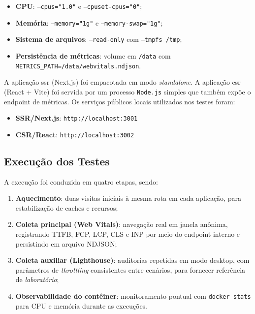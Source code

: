 \begin{itemize}
    \item \textbf{CPU}: \texttt{--cpus="1.0"} e \texttt{--cpuset-cpus="0"};
    \item \textbf{Memória}: \texttt{--memory="1g"} e \texttt{--memory-swap="1g"};
    \item \textbf{Sistema de arquivos}: \texttt{--read-only} com \texttt{--tmpfs /tmp};
    \item \textbf{Persistência de métricas}: volume em \texttt{/data} com \texttt{METRICS\_PATH=/data/webvitals.ndjson}.
\end{itemize}

A aplicação \acrshort{ssr} (Next.js) foi empacotada em modo \textit{standalone}. A aplicação \acrshort{csr} (React + Vite) foi servida por um processo \texttt{Node.js} simples que também expõe o endpoint de métricas. Os serviços públicos locais utilizados nos testes foram:
\begin{itemize}
    \item \textbf{SSR/Next.js}: \texttt{http://localhost:3001}
    \item \textbf{CSR/React}: \texttt{http://localhost:3002}
\end{itemize}

\subsection{Execução dos Testes}

A execução foi conduzida em quatro etapas, sendo:

\begin{enumerate}
    \item \textbf{Aquecimento}: duas visitas iniciais à mesma rota em cada aplicação, para estabilização de caches e recursos;
    \item \textbf{Coleta principal (Web Vitals)}: navegação real em janela anônima, registrando TTFB, FCP, LCP, CLS e INP por meio do endpoint interno e persistindo em arquivo NDJSON;
    \item \textbf{Coleta auxiliar (Lighthouse)}: auditorias repetidas em modo desktop, com parâmetros de \textit{throttling} consistentes entre cenários, para fornecer referência de \textit{laboratório};
    \item \textbf{Observabilidade do contêiner}: monitoramento pontual com \texttt{docker stats} para CPU e memória durante as execuções.
\end{enumerate}


